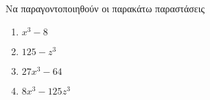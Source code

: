 Να παραγοντοποιηθούν οι παρακάτω παραστάσεις
\begin{multicols}{3}
\begin{enumerate}[label=\roman*.]
\item $ x^3-8 $
\item $ 125-z^3 $
\item $ 27x^3-64 $
\item $ 8x^3-125z^3 $
\end{enumerate}
\end{multicols}
